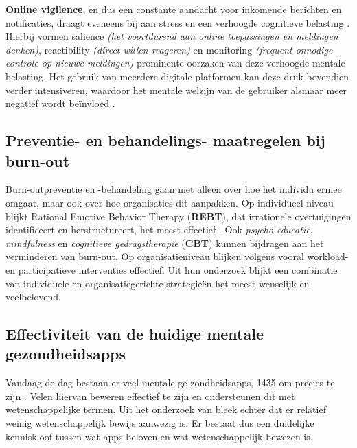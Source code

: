 \vspace{1em}

\textbf{Online vigilence}, en dus een constante aandacht voor inkomende berichten en notificaties, draagt eveneens bij aan stress en een verhoogde cognitieve belasting \autocite{Freytag2020}. Hierbij vormen salience \emph{(het voortdurend aan online toepassingen en meldingen denken)}, reactibility \emph{(direct willen reageren)} en monitoring \emph{(frequent onnodige controle op nieuwe meldingen)} prominente oorzaken van deze verhoogde mentale belasting. Het gebruik van meerdere digitale platformen kan deze druk bovendien verder intensiveren, waardoor het mentale welzijn van de gebruiker alsmaar meer negatief wordt beïnvloed \autocite{Ibrahim2025}.

\vspace{1em}

\subsection{Preventie- en behandelings- \newline maatregelen bij burn-out}%
\label{subsec:preventiestrategieën}

\vspace{1em}
Burn-outpreventie en -behandeling gaan niet alleen over hoe het individu ermee omgaat, maar ook over hoe organisaties dit aanpakken. Op individueel niveau blijkt Rational Emotive Behavior Therapy (\textbf{REBT}), dat irrationele overtuigingen identificeert en herstructureert, het meest effectief \autocite{Madigan2023}. Ook \emph{psycho-educatie}, \emph{mindfulness} en \emph{cognitieve gedragstherapie} (\textbf{CBT}) kunnen bijdragen aan het verminderen van burn-out. Op organisatieniveau blijken volgens \textcite{Bes2023} vooral workload- en participatieve interventies effectief. Uit hun onderzoek blijkt een combinatie van individuele en organisatiegerichte strategieën het meest wenselijk en veelbelovend.
\vspace{1em}

\subsection{Effectiviteit van de huidige \newline mentale gezondheidsapps}%
\label{subsec:effectiviteit_huidige_apps}

\vspace{1em}

Vandaag de dag bestaan er veel mentale ge-zondheidsapps, 1435 om precies te zijn \autocite{Larsen2019}. Velen hiervan beweren effectief te zijn en ondersteunen dit met wetenschappelijke termen. Uit het onderzoek van \textcite{Larsen2019} bleek echter dat  er relatief weinig wetenschappelijk bewijs aanwezig is. Er bestaat dus een duidelijke kenniskloof tussen wat apps beloven en wat wetenschappelijk bewezen is.

